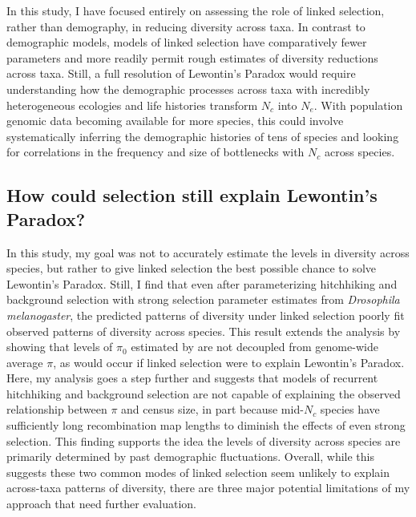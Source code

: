 \documentclass[9pt,lineno]{elife}
\begin{document}
In this study, I have focused entirely on assessing the role of linked
selection, rather than demography, in reducing diversity across taxa. In
contrast to demographic models, models of linked selection have comparatively
fewer parameters and more readily permit rough estimates of diversity
reductions across taxa. Still, a full resolution of Lewontin's Paradox would
require understanding how the demographic processes across taxa with incredibly
heterogeneous ecologies and life histories transform $N_c$ into $N_e$. With
population genomic data becoming available for more species, this could involve
systematically inferring the demographic histories of tens of species and
looking for correlations in the frequency and size of bottlenecks with $N_c$
across species.

\subsection{How could selection still explain Lewontin's Paradox?}

In this study, my goal was not to accurately estimate the levels in diversity
across species, but rather to give linked selection the best possible chance to
solve Lewontin's Paradox. Still, I find that even after parameterizing
hitchhiking and background selection with strong selection parameter estimates
from \emph{Drosophila melanogaster}, the predicted patterns of diversity under
linked selection poorly fit observed patterns of diversity across species.
This result extends the analysis by \cite{Coop2016-gx} showing that levels
of $\pi_0$ estimated by \cite{Corbett-Detig2015-gt} are not decoupled from
genome-wide average $\pi$, as would occur if linked selection were to explain
Lewontin's Paradox. Here, my analysis goes a step further and suggests that
models of recurrent hitchhiking and background selection are not capable of
explaining the observed relationship between $\pi$ and census size, in part
because mid-$N_c$ species have sufficiently long recombination map lengths to
diminish the effects of even strong selection. This finding supports the idea
the levels of diversity across species are primarily determined by past
demographic fluctuations. Overall, while this suggests these two common modes
of linked selection seem unlikely to explain across-taxa patterns of diversity,
there are three major potential limitations of my approach that need further
evaluation. 
\end{document}
